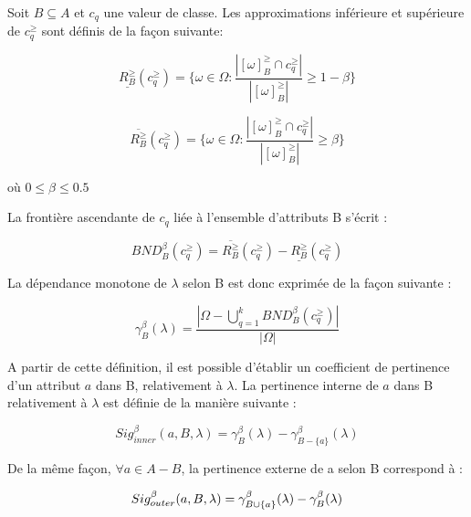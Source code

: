 \documentclass[a4paper]{article}
\begin{document}
\noindent Soit $B \subseteq A$ et $c_q$ une valeur de classe. Les approximations
inférieure et supérieure de $c^{\geq}_q$ sont définis de la façon suivante:

\begin{equation}
    \underline{R^{\geq}_B}(c^{\geq}_q) = \{\omega \in \Omega :
    \frac{|[\omega]^{\geq}_B \cap c^{\geq}_q|}{|[\omega]^{\geq}_B|} \geq 1 -
    \beta\}
\end{equation}

\begin{equation}
    \overline{R^{\geq}_B}(c^{\geq}_q) = \{\omega \in \Omega :
    \frac{|[\omega]^{\geq}_B \cap c^{\geq}_q|}{|[\omega]^{\geq}_B|} \geq \beta\}
\end{equation}

\noindent où $0 \leq \beta \leq 0.5$

\noindent La frontière ascendante de $c_q$ liée à l'ensemble d'attributs B s'écrit :

\begin{equation}
    BND^{\beta}_B(c^{\geq}_q) = \overline{R^{\geq}_B}(c^{\geq}_q) -
    \underline{R^{\geq}_B}(c^{\geq}_q)
\end{equation}

\noindent La dépendance monotone de $\lambda$ selon B est donc exprimée de la façon
suivante :

\begin{equation}
    \gamma^{\beta}_B(\lambda) = \frac{|\Omega - \bigcup_{q=1}^k
    BND^{\beta}_B(c^{\geq}_q)|}{|\Omega|}
\end{equation}

\noindent A partir de cette définition, il est possible d'établir un coefficient de
pertinence d'un attribut $a$ dans B, relativement à $\lambda$. La pertinence
interne de $a$ dans B relativement à $\lambda$ est définie de la manière suivante
:

\begin{equation}
    Sig^{\beta}_{inner}(a, B, \lambda) = \gamma^{\beta}_B(\lambda) -
    \gamma^{\beta}_{B-\{a\}}(\lambda)
\label{eq:sig-inner}
\end{equation}

\noindent De la même façon, $\forall a \in A-B$, la pertinence externe de a selon B
correspond à :

\begin{equation}
    Sig^{\beta}_{outer}(a, B, \lambda) = \gamma^{\beta}_{B \cup \{a\}}(\lambda) -
    \gamma^{\beta}_B(\lambda) \\
\label{eq:sig-outer}
\end{equation}
\end{document}
